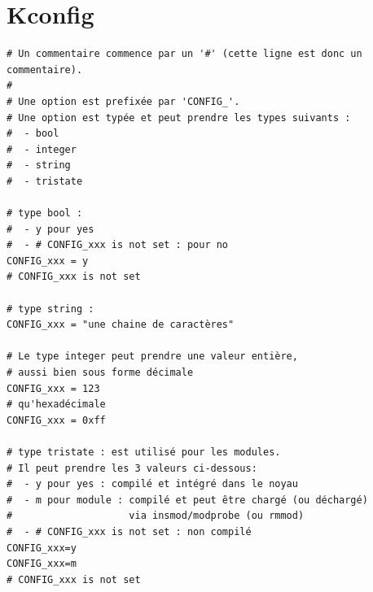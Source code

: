 \documentclass[a4paper]{article}
\begin{document}
\clearpage
\appendix

\section{Kconfig}

\begin{verbatim}
# Un commentaire commence par un '#' (cette ligne est donc un commentaire).
#
# Une option est prefixée par 'CONFIG_'.
# Une option est typée et peut prendre les types suivants :
#  - bool
#  - integer
#  - string
#  - tristate

# type bool :
#  - y pour yes
#  - # CONFIG_xxx is not set : pour no
CONFIG_xxx = y
# CONFIG_xxx is not set

# type string :
CONFIG_xxx = "une chaine de caractères"

# Le type integer peut prendre une valeur entière,
# aussi bien sous forme décimale
CONFIG_xxx = 123
# qu'hexadécimale
CONFIG_xxx = 0xff

# type tristate : est utilisé pour les modules.
# Il peut prendre les 3 valeurs ci-dessous:
#  - y pour yes : compilé et intégré dans le noyau
#  - m pour module : compilé et peut être chargé (ou déchargé)
#                    via insmod/modprobe (ou rmmod)
#  - # CONFIG_xxx is not set : non compilé
CONFIG_xxx=y
CONFIG_xxx=m
# CONFIG_xxx is not set
\end{verbatim}

\clearpage
\listoffigures

\clearpage
\listoftables
\end{document}
